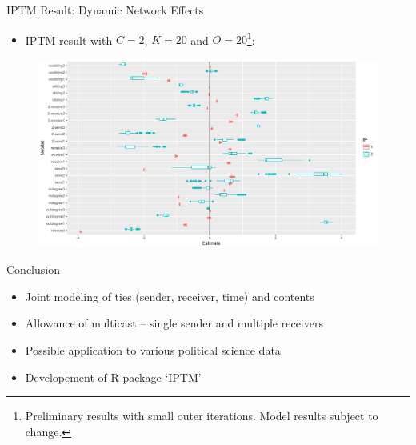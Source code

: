 \documentclass[10pt]{beamer}
\def\bni{\begin{itemize}} \def\ei{\end{itemize}}
\theoremstyle{definition}
\theoremstyle{remark}
\begin{document}
\begin{frame}{IPTM Result: Dynamic Network Effects}
	\bni \item IPTM result with $C=2$, $K=20$ and $O= 20$\footnote{Preliminary results with small outer iterations. Model results subject to change.}:
	\ei
	\begin{figure}
		\includegraphics[width=1\textwidth]{figures/DareBplot.pdf}
	\end{figure}	
\end{frame}
\begin{frame}{Conclusion}
 \bni
 \item Joint modeling of ties (sender, receiver, time) and contents
 	\vspace{0.4cm}
 \item Allowance of multicast -- single sender and multiple receivers
 	\vspace{0.4cm}
 \item Possible application to various political science data
 	\vspace{0.4cm}
 	\item Developement of R package `IPTM'
 \ei
\end{frame}
\end{document}
